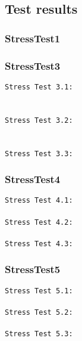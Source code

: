 \begin{description}
\subsection{Test results}

\subsubsection{StressTest1}


\subsubsection{StressTest3}
\texttt{Stress Test 3.1:}\\
\\ \\

\texttt{Stress Test 3.2:}\\
\\ \\

\texttt{Stress Test 3.3:}\\


\subsubsection{StressTest4}
\texttt{Stress Test 4.1:}\\
\\

\texttt{Stress Test 4.2:}\\
\\

\texttt{Stress Test 4.3:}\\


\subsubsection{StressTest5}
\texttt{Stress Test 5.1:}\\
\\

\texttt{Stress Test 5.2:}\\
\\

\texttt{Stress Test 5.3:}\\



\end{description}
